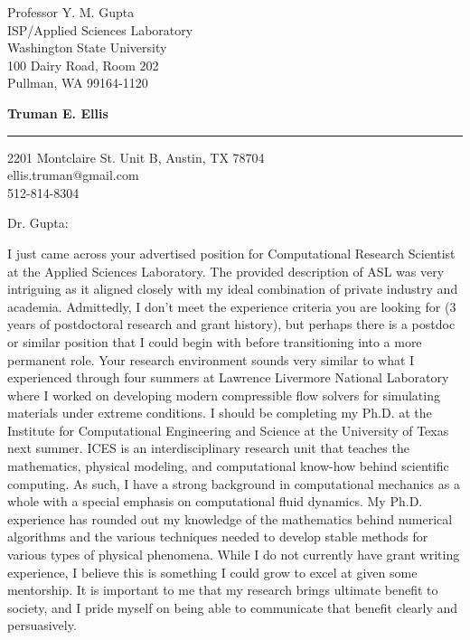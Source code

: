 \documentclass{letter} %
\begin{document}
\signature{Truman E. Ellis}           %
\longindentation=0pt                       %
\let\raggedleft\raggedright                %
 
 
\begin{letter}{
Professor Y. M. Gupta\\
ISP/Applied Sciences Laboratory\\
Washington State University\\
100 Dairy Road, Room 202\\
Pullman, WA 99164-1120\\
}

\begin{flushleft}
{\large\bf Truman E. Ellis}
\end{flushleft}
\medskip\hrule height 1pt
\begin{flushright}
\hfill 2201 Montclaire St. Unit B, Austin, TX 78704 \\
\hfill ellis.truman@gmail.com\\
\hfill 512-814-8304\\
\end{flushright} 
\vfill %

 
\opening{Dr. Gupta:} 
 
\noindent I just came across your advertised position for Computational Research Scientist at the Applied Sciences Laboratory.
The provided description of ASL was very intriguing as it aligned closely with my ideal combination of private industry and academia.
Admittedly, I don't meet the experience criteria you are looking for (3 years of postdoctoral research and grant history), 
but perhaps there is a postdoc or similar position that I could begin with before transitioning into a more permanent role.
Your research environment sounds very similar to what I experienced through four summers at Lawrence Livermore National Laboratory
where I worked on developing modern compressible flow solvers for simulating materials under extreme conditions.
I should be completing my Ph.D. at the Institute for Computational Engineering and Science at the University of Texas next summer.
ICES is an interdisciplinary research unit that teaches the mathematics, physical modeling, and computational know-how behind scientific computing.
As such, I have a strong background in computational mechanics as a whole with a special emphasis on computational fluid dynamics.
My Ph.D. experience has rounded out my knowledge of the mathematics behind numerical algorithms and the various techniques needed to develop
stable methods for various types of physical phenomena.
While I do not currently have grant writing experience, I believe this is something I could grow to excel at given some mentorship.
It is important to me that my research brings ultimate benefit to society, and I pride myself on being able to communicate 
that benefit clearly and persuasively.


\end{letter}
\end{document}
